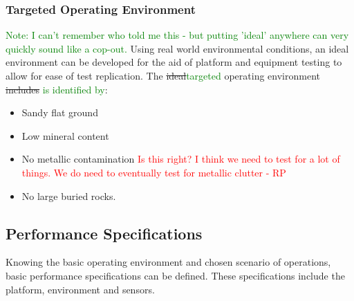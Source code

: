 \documentclass[main.tex]{subfiles}
\begin{document}
 \subsubsection{Targeted Operating Environment}
 \textcolor{green}{Note: I can't remember who told me this - but putting 'ideal' anywhere can very quickly sound like a cop-out. }
 Using real world environmental conditions, an ideal environment can be developed for the aid of platform and equipment testing to allow for ease of test replication. The \sout{ideal}\textcolor{green}{targeted} operating environment \sout{includes} \textcolor{green}{is identified by}: 
 \begin{itemize}
 \item Sandy flat ground 
 \item Low mineral content
 \item No metallic contamination \textcolor{red}{Is this right? I think we need to test for a lot of things. We do need to eventually test for metallic clutter - RP}
 \item No large buried rocks.
 \end{itemize}
\subsection{Performance Specifications}
 Knowing the basic operating environment and chosen scenario of operations, basic performance specifications can be defined. These specifications include the platform, environment and sensors.
\end{document}

